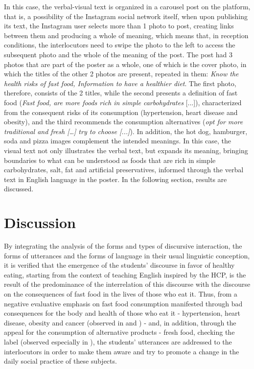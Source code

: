 \documentclass[english]{textolivre}
\begin{document}
In this case, the verbal-visual text is organized in a carousel post on the platform, that is, a possibility of the Instagram social network itself, when upon publishing its text, the Instagram user selects more than 1 photo to post, creating links between them and producing a whole of meaning, which means that, in reception conditions, the interlocutors need to swipe the photo to the left to access the subsequent photo and the whole of the meaning of the post. The post had 3 photos that are part of the poster as a whole, one of which is the cover photo, in which the titles of the other 2 photos are present, repeated in them: \emph{Know the health risks of fast food, Information to have a healthier diet}. The first photo, therefore, consists of the 2 titles, while the second presents a definition of fast food (\emph{Fast food, are more foods rich in simple carbohydrates} [...]), characterized from the consequent risks of its consumption (hypertension, heart disease and obesity), and the third recommends the consumption alternatives (\emph{opt for more traditional and fresh […] try to choose [...]}). In addition, the hot dog, hamburger, soda and pizza images complement the intended meanings. In this case, the visual text not only illustrates the verbal text, but expands its meaning, bringing boundaries to what can be understood as foods that are rich in simple carbohydrates, salt, fat and artificial preservatives, informed through the verbal text in English language in the poster. In the following section, results are discussed.






\section{Discussion}
By integrating the analysis of the forms and types of discursive interaction, the forms of utterances and the forms of language in their usual linguistic conception, it is verified that the emergence of the students’ discourse in favor of healthy eating, starting from the context of teaching English inspired by the HCP, is the result of the predominance of the interrelation of this discourse with the discourse on the consequences of fast food in the lives of those who eat it. Thus, from a negative evaluative emphasis on fast food consumption manifested through bad consequences for the body and health of those who eat it - hypertension, heart disease, obesity and cancer (observed in  and ) - and, in addition, through the appeal for the consumption of alternative products - fresh food, checking the label (observed especially in ), the students’ utterances are addressed to the interlocutors in order to make them aware and try to promote a change in the daily social practice of these subjects.
\end{document}
